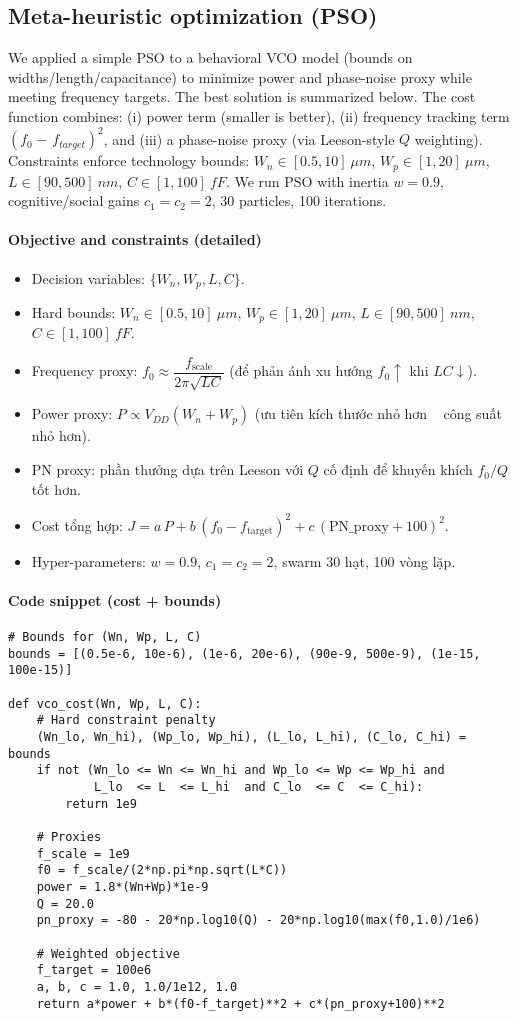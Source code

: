 \subsection*{Meta-heuristic optimization (PSO)}
We applied a simple PSO to a behavioral VCO model (bounds on widths/length/capacitance) to minimize power and phase-noise proxy while meeting frequency targets. The best solution is summarized below.
The cost function combines: (i) power term (smaller is better), (ii) frequency tracking term $(f_0-\,f_{target})^2$, and (iii) a phase-noise proxy (via Leeson-style $Q$ weighting). Constraints enforce technology bounds: $W_n\in[0.5,10]~\mu m$, $W_p\in[1,20]~\mu m$, $L\in[90,500]~nm$, $C\in[1,100]~fF$.
We run PSO with inertia $w=0.9$, cognitive/social gains $c_1=c_2=2$, 30 particles, 100 iterations.

\paragraph{Objective and constraints (detailed)}
\begin{itemize}
  \item Decision variables: $\{W_n, W_p, L, C\}$.
  \item Hard bounds: $W_n\in[0.5,10]~\mu m$, $W_p\in[1,20]~\mu m$, $L\in[90,500]~nm$, $C\in[1,100]~fF$.
  \item Frequency proxy: $f_0 \approx \dfrac{f_{\text{scale}}}{2\pi\sqrt{LC}}$ (để phản ánh xu hướng $f_0 \uparrow$ khi $LC \downarrow$).
  \item Power proxy: $P \propto V_{DD}(W_n+W_p)$ (ưu tiên kích thước nhỏ hơn ~ công suất nhỏ hơn).
  \item PN proxy: phần thưởng dựa trên Leeson với $Q$ cố định để khuyến khích $f_0/Q$ tốt hơn.
  \item Cost tổng hợp: $J = a\,P + b\,(f_0-f_{\text{target}})^2 + c\,(\text{PN\_proxy}+100)^2$.
  \item Hyper-parameters: $w=0.9$, $c_1=c_2=2$, swarm 30 hạt, 100 vòng lặp.
\end{itemize}

\paragraph{Code snippet (cost + bounds)}
\begin{lstlisting}[style=codepy, caption={PSO objective with bounds (Python)}]
# Bounds for (Wn, Wp, L, C)
bounds = [(0.5e-6, 10e-6), (1e-6, 20e-6), (90e-9, 500e-9), (1e-15, 100e-15)]

def vco_cost(Wn, Wp, L, C):
    # Hard constraint penalty
    (Wn_lo, Wn_hi), (Wp_lo, Wp_hi), (L_lo, L_hi), (C_lo, C_hi) = bounds
    if not (Wn_lo <= Wn <= Wn_hi and Wp_lo <= Wp <= Wp_hi and
            L_lo  <= L  <= L_hi  and C_lo  <= C  <= C_hi):
        return 1e9

    # Proxies
    f_scale = 1e9
    f0 = f_scale/(2*np.pi*np.sqrt(L*C))
    power = 1.8*(Wn+Wp)*1e-9
    Q = 20.0
    pn_proxy = -80 - 20*np.log10(Q) - 20*np.log10(max(f0,1.0)/1e6)

    # Weighted objective
    f_target = 100e6
    a, b, c = 1.0, 1.0/1e12, 1.0
    return a*power + b*(f0-f_target)**2 + c*(pn_proxy+100)**2
\end{lstlisting}

